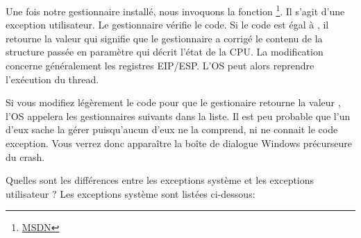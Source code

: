 

Une fois notre gestionnaire installé, nous invoquons la fonction 
\footnote{\href{http://go.yurichev.com/17253}{MSDN}}.
Il s'agit d'une exception utilisateur. 
Le gestionnaire vérifie le code.
Si le code est égal à , il retourne la valeur  qui 
signifie que le gestionnaire a corrigé le contenu de la structure passée en paramètre qui décrit 
l'état de la CPU. La modification concerne généralement les registres EIP/ESP. L'\ac{OS} peut alors 
reprendre l'exécution du thread.

Si vous modifiez légèrement le code pour que le gestionaire retourne la valeur ,
l'\ac{OS} appelera les gestionnaires suivants dans la liste. Il est peu probable que l'un d'eux sache 
la gérer puisqu'aucun d'eux ne la comprend, ni ne connait le code exception.
Vous verrez donc apparaître la boîte de dialogue Windows précurseure du crash.

Quelles sont les différences entre les exceptions système et les exceptions utilisateur ?
Les exceptions système sont listées ci-dessous:

